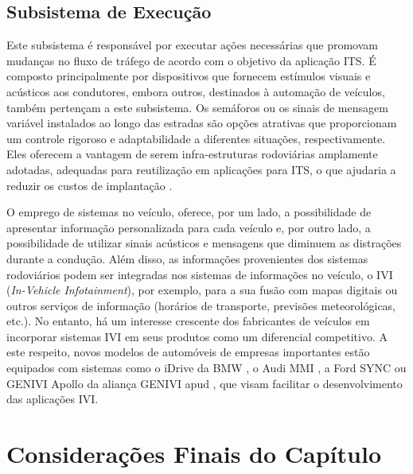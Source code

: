 \documentclass[
	12pt,				%
	oneside,			%
	a4paper,			%
	english,			%
	brazil				%
	]{abntex2ppgsi}
\begin{document}
\subsection{Subsistema de Execução}

Este subsistema é responsável por executar ações necessárias que promovam mudanças no fluxo de tráfego de acordo com o objetivo da aplicação ITS. É composto principalmente por dispositivos que fornecem estímulos visuais e acústicos aos condutores, embora outros, destinados à automação de veículos, também pertençam a este subsistema. Os semáforos ou os sinais de mensagem variável instalados ao longo das estradas são opções atrativas que proporcionam um controle rigoroso e adaptabilidade a diferentes situações, respectivamente. Eles oferecem a vantagem de serem infra-estruturas rodoviárias amplamente adotadas, adequadas para reutilização em aplicações para ITS, o que ajudaria a reduzir os custos de implantação \cite{losilla2011comprehensive}. 

O emprego de sistemas no veículo, oferece, por um lado, a possibilidade de apresentar informação personalizada para cada veículo e, por outro lado, a possibilidade de utilizar sinais acústicos e mensagens que diminuem as distrações durante a condução. Além disso, as informações provenientes dos sistemas rodoviários podem ser integradas nos sistemas de informações no veículo, o IVI (\textit{In-Vehicle Infotainment}), por exemplo, para a sua fusão com mapas digitais ou outros serviços de informação (horários de transporte, previsões meteorológicas, etc.). No entanto, há um interesse crescente dos fabricantes de veículos em incorporar sistemas IVI em seus produtos como um diferencial competitivo. A este respeito, novos modelos de automóveis de empresas importantes estão equipados com sistemas como o iDrive da BMW \cite{niedermaier2009new}, o Audi MMI , a Ford SYNC  ou GENIVI Apollo da aliança GENIVI apud  , que visam facilitar o desenvolvimento das aplicações IVI.



\section{Considerações Finais do Capítulo}
\end{document}
